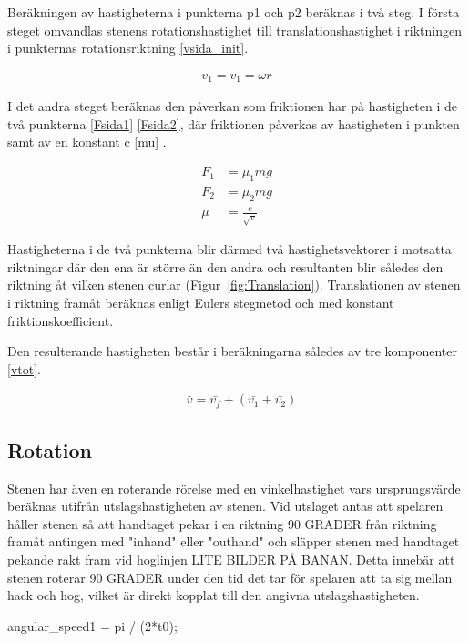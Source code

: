 \documentclass[11pt]{article} %
\begin{document}
Beräkningen av hastigheterna i punkterna p1 och p2 beräknas i två steg. I första steget omvandlas stenens rotationshastighet till translationshastighet i riktningen i punkternas rotationsriktning \eqref{vsida_init}. 
 
\begin{align}\label{vsida_init}
 v_1 = v_1 = \omega r
 \end{align}

I det andra steget beräknas den påverkan som friktionen har på hastigheten i de två punkterna \eqref{Fsida1} \eqref{Fsida2}, där friktionen påverkas av hastigheten i punkten samt av en konstant c \eqref{mu} . 

 \begin{align}\label{Fsida1}
 F_1& = \mu_1 mg\\\label{Fsida2}
F_2& = \mu_2 mg\\\label{mu}
\mu&=\frac{c}{\sqrt{v}}
 \end{align}

Hastigheterna i de två punkterna blir därmed två hastighetsvektorer i motsatta riktningar där den ena är större än den andra och resultanten blir således den riktning åt vilken stenen curlar (Figur~\ref{fig:Translation}). 
Translationen av stenen i riktning framåt beräknas enligt Eulers stegmetod och med konstant friktionskoefficient. 

Den resulterande hastigheten består i beräkningarna således av tre komponenter  \eqref{vtot}. 

 \begin{align}\label{vtot}
 &\bar{v}=\bar{v_f}+(\bar{v_1}+\bar{v_2})
 \end{align}

\subsection{Rotation}

Stenen har även en roterande rörelse med en vinkelhastighet vars ursprungsvärde beräknas utifrån utslagshastigheten av stenen.
Vid utslaget antas att spelaren håller stenen så att handtaget pekar i en riktning 90 GRADER från riktning framåt antingen med "inhand" eller "outhand" och släpper stenen med handtaget pekande rakt fram vid hoglinjen LITE BILDER PÅ BANAN. Detta innebär att stenen roterar 90 GRADER under den tid det tar för spelaren att ta sig mellan hack och hog, vilket är direkt kopplat till den angivna utslagshastigheten. 

 angular_speed1 = pi / (2*t0); 
\end{document}
